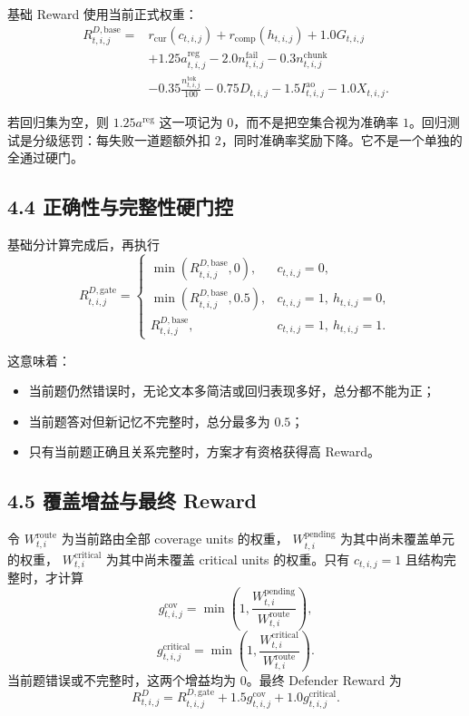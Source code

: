 \documentclass[a4paper,11pt]{article}
\begin{document}
基础 Reward 使用当前正式权重：
\begin{align*}
    R^{D,\mathrm{base}}_{t,i,j}
    ={}&
    r_{\mathrm{cur}}(c_{t,i,j})
    +r_{\mathrm{comp}}(h_{t,i,j})
    +1.0G_{t,i,j}\nonumber\\
    &+1.25a^{\mathrm{reg}}_{t,i,j}
    -2.0n^{\mathrm{fail}}_{t,i,j}
    -0.3n^{\mathrm{chunk}}_{t,i,j}\nonumber\\
    &-0.35\frac{n^{\mathrm{tok}}_{t,i,j}}{100}
    -0.75D_{t,i,j}
    -1.5I^{\mathrm{ao}}_{t,i,j}
    -1.0X_{t,i,j}.
\end{align*}

若回归集为空，则 $1.25a^{\mathrm{reg}}$ 这一项记为 $0$，而不是把空集合视为准确率 $1$。回归测试是分级惩罚：每失败一道题额外扣 $2$，同时准确率奖励下降。它不是一个单独的全通过硬门。

\subsection*{4.4 正确性与完整性硬门控}

基础分计算完成后，再执行
\[
    R^{D,\mathrm{gate}}_{t,i,j}
    =
    \begin{cases}
        \min(R^{D,\mathrm{base}}_{t,i,j},0),
        & c_{t,i,j}=0,\\
        \min(R^{D,\mathrm{base}}_{t,i,j},0.5),
        & c_{t,i,j}=1,\ h_{t,i,j}=0,\\
        R^{D,\mathrm{base}}_{t,i,j},
        & c_{t,i,j}=1,\ h_{t,i,j}=1.
    \end{cases}
\]

这意味着：
\begin{itemize}
    \item 当前题仍然错误时，无论文本多简洁或回归表现多好，总分都不能为正；
    \item 当前题答对但新记忆不完整时，总分最多为 $0.5$；
    \item 只有当前题正确且关系完整时，方案才有资格获得高 Reward。
\end{itemize}

\subsection*{4.5 覆盖增益与最终 Reward}

令 $W^{\mathrm{route}}_{t,i}$ 为当前路由全部 coverage units 的权重，
$W^{\mathrm{pending}}_{t,i}$ 为其中尚未覆盖单元的权重，
$W^{\mathrm{critical}}_{t,i}$ 为其中尚未覆盖 critical units 的权重。只有
$c_{t,i,j}=1$ 且结构完整时，才计算
\[
    g^{\mathrm{cov}}_{t,i,j}
    =
    \min\!\left(
      1,
      \frac{W^{\mathrm{pending}}_{t,i}}
           {W^{\mathrm{route}}_{t,i}}
    \right),
\]
\[
    g^{\mathrm{critical}}_{t,i,j}
    =
    \min\!\left(
      1,
      \frac{W^{\mathrm{critical}}_{t,i}}
           {W^{\mathrm{route}}_{t,i}}
    \right).
\]
当前题错误或不完整时，这两个增益均为 $0$。最终 Defender Reward 为
\[
    \boxed{
    R^D_{t,i,j}
    =
    R^{D,\mathrm{gate}}_{t,i,j}
    +1.5g^{\mathrm{cov}}_{t,i,j}
    +1.0g^{\mathrm{critical}}_{t,i,j}
    }.
\]
\end{document}
